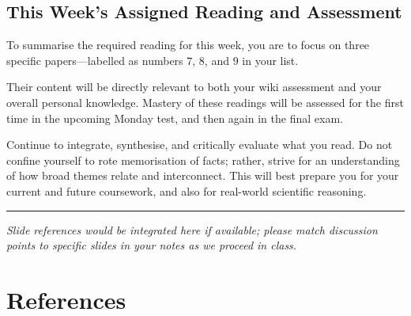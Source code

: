 \documentclass[
  11pt,
]{book}
\begin{document}
\section{This Week's Assigned Reading and
Assessment}\label{this-weeks-assigned-reading-and-assessment}

To summarise the required reading for this week, you are to focus on
three specific papers---labelled as numbers \(7\), \(8\), and \(9\) in
your list.

Their content will be directly relevant to both your wiki assessment and
your overall personal knowledge. Mastery of these readings will be
assessed for the first time in the upcoming Monday test, and then again
in the final exam.

Continue to integrate, synthesise, and critically evaluate what you
read. Do not confine yourself to rote memorisation of facts; rather,
strive for an understanding of how broad themes relate and interconnect.
This will best prepare you for your current and future coursework, and
also for real-world scientific reasoning.

\begin{center}\rule{0.5\linewidth}{0.5pt}\end{center}

\emph{Slide references would be integrated here if available; please
match discussion points to specific slides in your notes as we proceed
in class.}

\chapter*{References}\label{references}
\end{document}
